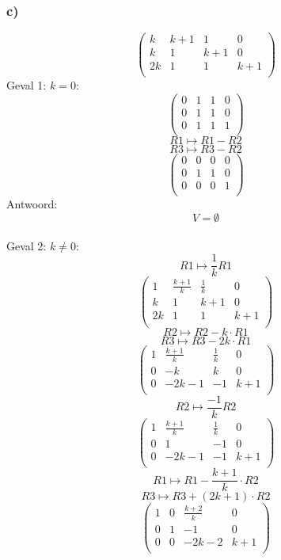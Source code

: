 \documentclass[10pt,a4paper]{article}
\begin{document}
\subsubsection*{c)}
\[
\begin{pmatrix}
k & k+1 & 1 & 0\\
k & 1 & k+1 & 0\\
2k & 1 & 1 & k+1\\
\end{pmatrix}
\]
Geval 1: $k=0$:
\[
\begin{pmatrix}
0 & 1 & 1 & 0\\
0 & 1 & 1 & 0\\
0 & 1 & 1 & 1\\
\end{pmatrix}
\]
\[ R1 \longmapsto R1 - R2 \]
\[ R3 \longmapsto R3 - R2 \]
\[
\begin{pmatrix}
0 & 0 & 0 & 0\\
0 & 1 & 1 & 0\\
0 & 0 & 0 & 1\\
\end{pmatrix}
\]
Antwoord:
\[
V=\emptyset
\]\\
Geval 2: $k\neq0$:
\[ R1 \longmapsto \frac{1}{k}R1 \]
\[
\begin{pmatrix}
1 & \frac{k+1}{k} & \frac{1}{k} & 0\\
k & 1 & k+1 & 0\\
2k & 1 & 1 & k+1\\
\end{pmatrix}
\]
\[ R2 \longmapsto R2 - k\cdot R1 \]
\[ R3 \longmapsto R3 - 2k\cdot R1 \]
\[
\begin{pmatrix}
1 & \frac{k+1}{k} & \frac{1}{k} & 0\\
0 & -k & k & 0\\
0 & -2k-1 & -1 & k+1\\
\end{pmatrix}
\]
\[ R2 \longmapsto \frac{-1}{k}R2\]
\[
\begin{pmatrix}
1 & \frac{k+1}{k} & \frac{1}{k} & 0\\
0 & 1 & -1 & 0\\
0 & -2k-1 & -1 & k+1\\
\end{pmatrix}
\]
\[ R1 \longmapsto R1 - \frac{k+1}{k}\cdot R2 \]
\[ R3 \longmapsto R3 + (2k+1)\cdot R2 \]
\[
\begin{pmatrix}
1 & 0 & \frac{k+2}{k} & 0\\
0 & 1 & -1 & 0\\
0 & 0 & -2k-2 & k+1\\
\end{pmatrix}
\]
\end{document}
